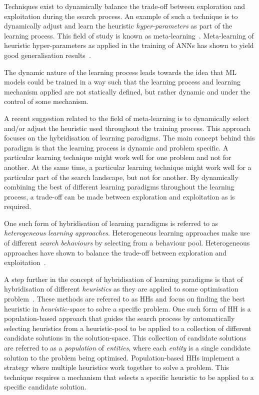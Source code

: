 Techniques exist to dynamically balance the trade-off between exploration and exploitation during the search process. An example of such a technique is to dynamically adjust and learn the heuristic \textit{hyper-parameters} as part of the learning process. This field of study is known as meta-learning~\cite{ref:giraud:2004}. Meta-learning of heuristic hyper-parameters as applied in the training of \acp{ANN} has shown to yield good generalisation results~\cite{ref:hospedales:2020, ref:vilalta:2002}.

The dynamic nature of the learning process leads towards the idea that \acs{ML} models could be trained in a way such that the learning process and learning mechanism applied are not statically defined, but rather dynamic and under the control of some mechanism.

A recent suggestion related to the field of meta-learning is to dynamically select and/or adjust the heuristic used throughout the training process. This approach focuses on the hybridisation of learning paradigms. The main concept behind this paradigm is that the learning process is dynamic and problem specific. A particular learning technique might work well for one problem and not for another. At the same time, a particular learning technique might work well for a particular part of the search landscape, but not for another. By dynamically combining the best of different learning paradigms throughout the learning process, a trade-off can be made between exploration and exploitation as is required.

One such form of hybridisation of learning paradigms is referred to as \textit{heterogeneous learning approaches}. Heterogeneous learning approaches make use of different \textit{search behaviours} by selecting from a behaviour pool. Heterogeneous approaches have shown to balance the trade-off between exploration and exploitation~\cite{ref:nepomuceno:2013}.

A step further in the concept of hybridisation of learning paradigms is that of hybridisation of different \textit{heuristics} as they are applied to some optimisation problem~\cite{ref:burke:2013}. These methods are referred to as \acfp{HH} and focus on finding the best heuristic in \textit{heuristic-space} to solve a specific problem. One such form of \acs{HH} is a population-based approach that guides the search process by automatically selecting heuristics from a heuristic-pool to be applied to a collection of different candidate solutions in the solution-space. This collection of candidate solutions are referred to as a \textit{population} of \textit{entities}, where each \textit{entity} is a single candidate solution to the problem being optimised. Population-based \acp{HH} implement a strategy where multiple heuristics work together to solve a problem. This technique requires a mechanism that selects a specific heuristic to be applied to a specific candidate solution.

